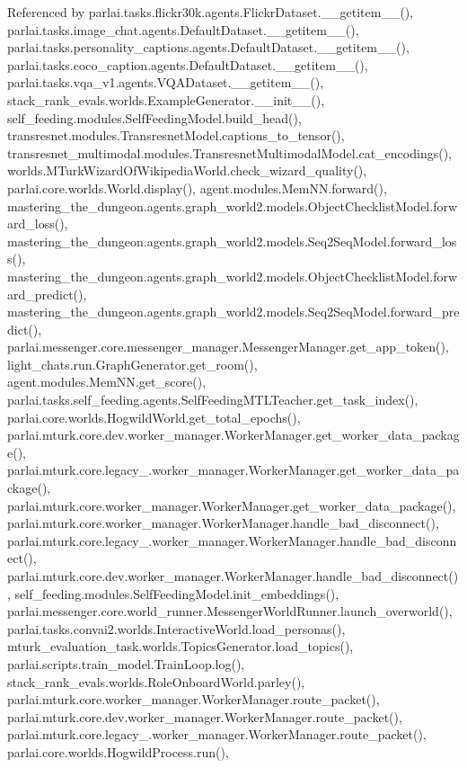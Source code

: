 Referenced by parlai.\+tasks.\+flickr30k.\+agents.\+Flickr\+Dataset.\+\_\+\+\_\+getitem\+\_\+\+\_\+(), parlai.\+tasks.\+image\+\_\+chat.\+agents.\+Default\+Dataset.\+\_\+\+\_\+getitem\+\_\+\+\_\+(), parlai.\+tasks.\+personality\+\_\+captions.\+agents.\+Default\+Dataset.\+\_\+\+\_\+getitem\+\_\+\+\_\+(), parlai.\+tasks.\+coco\+\_\+caption.\+agents.\+Default\+Dataset.\+\_\+\+\_\+getitem\+\_\+\+\_\+(), parlai.\+tasks.\+vqa\+\_\+v1.\+agents.\+V\+Q\+A\+Dataset.\+\_\+\+\_\+getitem\+\_\+\+\_\+(), stack\+\_\+rank\+\_\+evals.\+worlds.\+Example\+Generator.\+\_\+\+\_\+init\+\_\+\+\_\+(), self\+\_\+feeding.\+modules.\+Self\+Feeding\+Model.\+build\+\_\+head(), transresnet.\+modules.\+Transresnet\+Model.\+captions\+\_\+to\+\_\+tensor(), transresnet\+\_\+multimodal.\+modules.\+Transresnet\+Multimodal\+Model.\+cat\+\_\+encodings(), worlds.\+M\+Turk\+Wizard\+Of\+Wikipedia\+World.\+check\+\_\+wizard\+\_\+quality(), parlai.\+core.\+worlds.\+World.\+display(), agent.\+modules.\+Mem\+N\+N.\+forward(), mastering\+\_\+the\+\_\+dungeon.\+agents.\+graph\+\_\+world2.\+models.\+Object\+Checklist\+Model.\+forward\+\_\+loss(), mastering\+\_\+the\+\_\+dungeon.\+agents.\+graph\+\_\+world2.\+models.\+Seq2\+Seq\+Model.\+forward\+\_\+loss(), mastering\+\_\+the\+\_\+dungeon.\+agents.\+graph\+\_\+world2.\+models.\+Object\+Checklist\+Model.\+forward\+\_\+predict(), mastering\+\_\+the\+\_\+dungeon.\+agents.\+graph\+\_\+world2.\+models.\+Seq2\+Seq\+Model.\+forward\+\_\+predict(), parlai.\+messenger.\+core.\+messenger\+\_\+manager.\+Messenger\+Manager.\+get\+\_\+app\+\_\+token(), light\+\_\+chats.\+run.\+Graph\+Generator.\+get\+\_\+room(), agent.\+modules.\+Mem\+N\+N.\+get\+\_\+score(), parlai.\+tasks.\+self\+\_\+feeding.\+agents.\+Self\+Feeding\+M\+T\+L\+Teacher.\+get\+\_\+task\+\_\+index(), parlai.\+core.\+worlds.\+Hogwild\+World.\+get\+\_\+total\+\_\+epochs(), parlai.\+mturk.\+core.\+dev.\+worker\+\_\+manager.\+Worker\+Manager.\+get\+\_\+worker\+\_\+data\+\_\+package(), parlai.\+mturk.\+core.\+legacy\+\_.\+worker\+\_\+manager.\+Worker\+Manager.\+get\+\_\+worker\+\_\+data\+\_\+package(), parlai.\+mturk.\+core.\+worker\+\_\+manager.\+Worker\+Manager.\+get\+\_\+worker\+\_\+data\+\_\+package(), parlai.\+mturk.\+core.\+worker\+\_\+manager.\+Worker\+Manager.\+handle\+\_\+bad\+\_\+disconnect(), parlai.\+mturk.\+core.\+legacy\+\_.\+worker\+\_\+manager.\+Worker\+Manager.\+handle\+\_\+bad\+\_\+disconnect(), parlai.\+mturk.\+core.\+dev.\+worker\+\_\+manager.\+Worker\+Manager.\+handle\+\_\+bad\+\_\+disconnect(), self\+\_\+feeding.\+modules.\+Self\+Feeding\+Model.\+init\+\_\+embeddings(), parlai.\+messenger.\+core.\+world\+\_\+runner.\+Messenger\+World\+Runner.\+launch\+\_\+overworld(), parlai.\+tasks.\+convai2.\+worlds.\+Interactive\+World.\+load\+\_\+personas(), mturk\+\_\+evaluation\+\_\+task.\+worlds.\+Topics\+Generator.\+load\+\_\+topics(), parlai.\+scripts.\+train\+\_\+model.\+Train\+Loop.\+log(), stack\+\_\+rank\+\_\+evals.\+worlds.\+Role\+Onboard\+World.\+parley(), parlai.\+mturk.\+core.\+worker\+\_\+manager.\+Worker\+Manager.\+route\+\_\+packet(), parlai.\+mturk.\+core.\+dev.\+worker\+\_\+manager.\+Worker\+Manager.\+route\+\_\+packet(), parlai.\+mturk.\+core.\+legacy\+\_.\+worker\+\_\+manager.\+Worker\+Manager.\+route\+\_\+packet(), parlai.\+core.\+worlds.\+Hogwild\+Process.\+run(), 